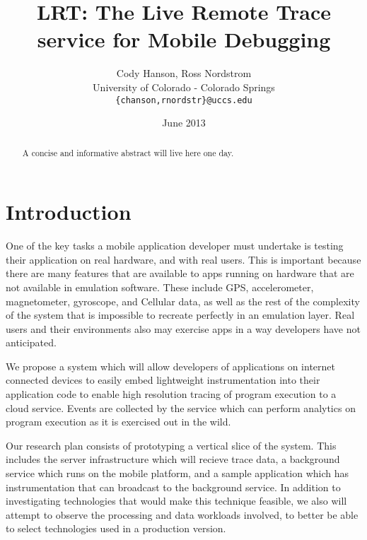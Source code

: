 \documentclass{acm_proc_article-sp}
\begin{document}
\title{LRT: The Live Remote Trace service for Mobile Debugging}
\author{Cody Hanson, Ross Nordstrom\\
        University of Colorado - Colorado Springs\\
        \texttt{\{chanson,rnordstr\}@uccs.edu}
       }
\date{June 2013}

\maketitle

\begin{abstract}
A concise and informative abstract will live here one day.
\end{abstract}

\section{Introduction}
One of the key tasks a mobile application developer must undertake is testing 
their application on real hardware, and with real users. This is important 
because there are many features that are available to apps running on hardware 
that are not available in emulation software. These include GPS, accelerometer, 
magnetometer, gyroscope, and Cellular data, as well as the rest of the 
complexity of the system that is impossible to recreate perfectly in an 
emulation layer. Real users and their environments also may exercise apps in
a way developers have not anticipated. 

We propose a system which will allow developers of applications on internet connected 
devices to easily embed lightweight instrumentation 
into their application code to enable high resolution 
tracing of program execution to a cloud service. Events are collected by 
the service which can perform analytics on program execution as it is 
exercised out in the wild.

Our research plan consists of prototyping a vertical slice of the system.
This includes the server infrastructure which will recieve trace data,
a background service which runs on the mobile platform, and a sample
application which has instrumentation that can broadcast to the background service.
In addition to investigating technologies that would make this technique 
feasible, we also will attempt to observe the processing and data workloads
involved, to better be able to select technologies used in a production version.
\end{document}
